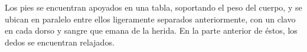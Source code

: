 Los pies se encuentran apoyados en una tabla, soportando el peso del cuerpo, y se ubican en paralelo entre ellos ligeramente separados anteriormente, con un clavo en cada dorso y sangre que emana de la herida. En la parte anterior de éstos, los dedos se encuentran relajados.







